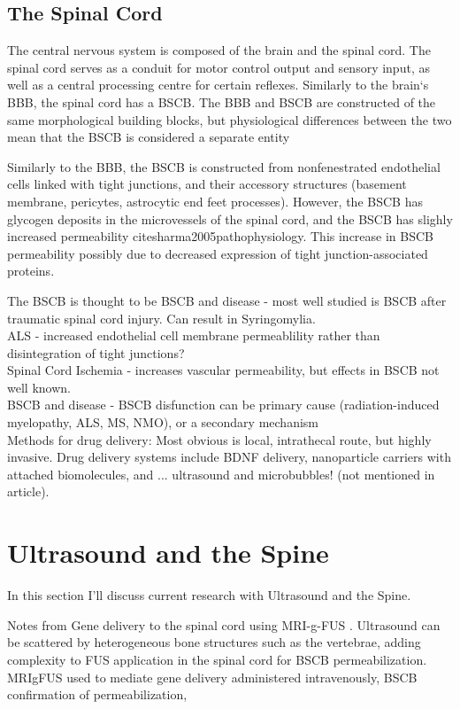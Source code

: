 \documentclass[11pt,titlepage]{article} %
\begin{document}
\subsection{The Spinal Cord}
The central nervous system is composed of the brain and the spinal cord. The spinal cord serves as a conduit for motor control output and sensory input, as well as a central processing centre for certain reflexes. Similarly to the brain`s BBB, the spinal cord has a BSCB. The BBB and BSCB are constructed of the same morphological building blocks, but physiological differences between the two mean that the BSCB is considered a separate entity \cite{bartanusz2011blood}

Similarly to the BBB, the BSCB is constructed from nonfenestrated endothelial cells linked with tight junctions, and their accessory structures (basement membrane, pericytes, astrocytic end feet processes). However, the BSCB has glycogen deposits in the microvessels of the spinal cord, and the BSCB has slighly increased permeability cite{sharma2005pathophysiology}. This increase in BSCB permeability possibly due to decreased expression of tight junction-associated proteins.

The BSCB is thought to be
BSCB and disease - most well studied is BSCB after traumatic spinal cord injury. Can result in Syringomylia.\\
ALS - increased endothelial cell membrane permeablility rather than disintegration of tight junctions?\\
Spinal Cord Ischemia - increases vascular permeability, but effects in BSCB not well known.\\
BSCB and disease - BSCB disfunction can be primary cause (radiation-induced myelopathy, ALS, MS, NMO), or a secondary mechanism\\
Methods for drug delivery: Most obvious is local, intrathecal route, but highly invasive. Drug delivery systems include BDNF delivery, nanoparticle carriers with attached biomolecules, and ... ultrasound and microbubbles! (not mentioned in article).


\section{Ultrasound and the Spine}

In this section I'll discuss current research with Ultrasound and the Spine.

Notes from Gene delivery to the spinal cord using MRI-g-FUS \cite{weber2015gene}.
Ultrasound can be scattered by heterogeneous bone structures such as the vertebrae, adding complexity to FUS application in the spinal cord for BSCB permeabilization.
MRIgFUS used to mediate gene delivery administered intravenously, BSCB confirmation of permeabilization, 
\end{document}
